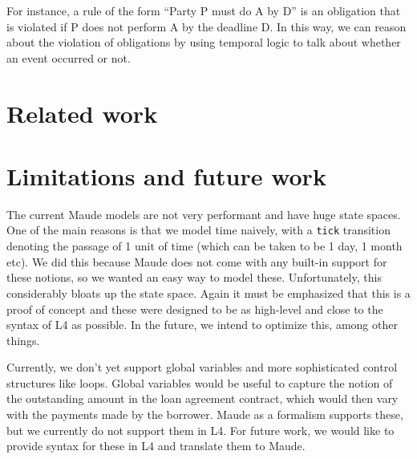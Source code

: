 \documentclass{article}
\begin{document}
For instance, a rule of the form ``Party P must do A by D'' is an obligation
that is violated if P does not perform A by the deadline D.
In this way, we can reason about the violation of obligations by using
temporal logic to talk about whether an event occurred or not.

\section{Related work}

\section{Limitations and future work}
The current Maude models are not very performant and have huge state spaces.
One of the main reasons is that we model time naively, with a \texttt{tick}
transition denoting the passage of 1 unit of time (which can be taken to be
1 day, 1 month etc).
We did this because Maude does not come with any built-in support for these notions,
so we wanted an easy way to model these.
Unfortunately, this considerably bloats up the state space.
Again it must be emphasized that this is a proof of concept and these were
designed to be as high-level and close to the syntax of L4 as possible.
In the future, we intend to optimize this, among other things.

Currently, we don't yet support global variables and more sophisticated control
structures like loops.
Global variables would be useful to capture the notion of the outstanding amount
in the loan agreement contract, which would then vary with the payments made by
the borrower.
Maude as a formalism supports these, but we currently do not support them in L4.
For future work, we would like to provide syntax for these in L4 and translate
them to Maude.

\newpage



\end{document}
